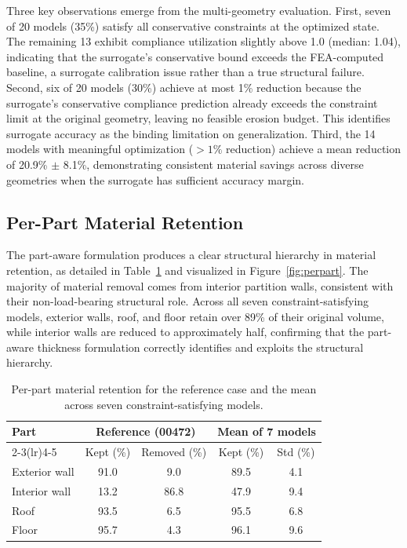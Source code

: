 \documentclass[11pt]{article}
\theoremstyle{plain}
\theoremstyle{definition}
\theoremstyle{remark}
\begin{document}
Three key observations emerge from the multi-geometry evaluation. First, seven of 20 models (35\%) satisfy all conservative constraints at the optimized state. The remaining 13 exhibit compliance utilization slightly above 1.0 (median: 1.04), indicating that the surrogate's conservative bound exceeds the FEA-computed baseline, a surrogate calibration issue rather than a true structural failure. Second, six of 20 models (30\%) achieve at most 1\% reduction because the surrogate's conservative compliance prediction already exceeds the constraint limit at the original geometry, leaving no feasible erosion budget. This identifies surrogate accuracy as the binding limitation on generalization. Third, the 14 models with meaningful optimization ($>1\%$ reduction) achieve a mean reduction of 20.9\% $\pm$ 8.1\%, demonstrating consistent material savings across diverse geometries when the surrogate has sufficient accuracy margin.

\subsection{Per-Part Material Retention}
\label{sec:perpart}

The part-aware formulation produces a clear structural hierarchy in material retention, as detailed in Table~\ref{tab:perpart} and visualized in Figure~\ref{fig:perpart}. The majority of material removal comes from interior partition walls, consistent with their non-load-bearing structural role. Across all seven constraint-satisfying models, exterior walls, roof, and floor retain over 89\% of their original volume, while interior walls are reduced to approximately half, confirming that the part-aware thickness formulation correctly identifies and exploits the structural hierarchy.

\begin{table}[t]
\centering
\caption{Per-part material retention for the reference case and the mean across seven constraint-satisfying models.}
\label{tab:perpart}
\small
\begin{tabular}{@{}lcccc@{}}
\toprule
\textbf{Part} & \multicolumn{2}{c}{\textbf{Reference (00472)}} & \multicolumn{2}{c}{\textbf{Mean of 7 models}} \\
\cmidrule(lr){2-3}\cmidrule(lr){4-5}
 & Kept (\%) & Removed (\%) & Kept (\%) & Std (\%) \\
\midrule
Exterior wall & 91.0 & 9.0 & 89.5 & 4.1 \\
Interior wall & 13.2 & 86.8 & 47.9 & 9.4 \\
Roof & 93.5 & 6.5 & 95.5 & 6.8 \\
Floor & 95.7 & 4.3 & 96.1 & 9.6 \\
\bottomrule
\end{tabular}
\end{table}
\end{document}
